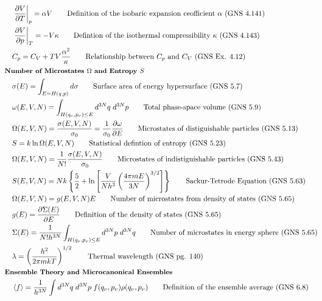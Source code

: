 \documentclass[10pt]{article}
\newcommand{\pder}[2]{\frac{\partial #1}{\partial #2}}
\newcommand{\lrp}[1]{\left( #1 \right)}
\newcommand{\lrb}[1]{\left[ #1 \right]}
\newcommand{\lrc}[1]{\left\{ #1 \right\}}
\newcommand{\evalb}[1]{\left. #1 \right|}
\begin{document}
\begin{multicols}{2}
	\setlength{\abovedisplayskip}{0pt}
	\setlength{\belowdisplayskip}{0pt}
	\setlength{\abovedisplayshortskip}{0pt}
	\setlength{\belowdisplayshortskip}{0pt}
	\begin{align*}
		& \evalb{\pder{V}{T}}_p = \alpha V	\tag*{Definition of the isobaric expansion ceofficient $\alpha$ (GNS 4.141)} \\
		& \evalb{\pder{V}{p}}_T = -V \kappa \tag*{Defintion of the isothermal compressibility $\kappa$ (GNS 4.143)} \\		
		& C_p = C_V +TV\frac{\alpha^2}{\kappa}	\tag*{Relationship between $C_p$ and $C_V$ (GNS Ex. 4.12)} \\
	& \small \hspace{-10pt} \textbf{Number of Microstates $\Omega$ and Entropy $S$} \small \\	
		& \sigma(E) = \int_{E=H(q,p)} d\sigma	\tag*{Surface area of energy hypersurface (GNS 5.7)} \\
		& \omega(E,V,N) = \int_{H(q_\nu, p_\nu) \leq E} d^{3N}q \; d^{3N} p	\tag*{Total phase-space volume (GNS 5.9)} \\
		& \Omega(E,V,N) = \frac{\sigma(E,V,N)}{\sigma_0} = \frac{1}{\sigma_0} \pder{\omega}{E}	\tag*{Microstates of distiguishable particles (GNS 5.13)} \\
		& S = k \ln \Omega(E,V,N)	\tag*{Statistical defintion of entropy (GNS 5.23)} \\
		& \Omega(E,V,N) = \frac{1}{N!} \frac{\sigma(E,V,N)}{\sigma_0}	\tag*{Microstates of indistiguishable particles (GNS 5.43)} \\
		& S(E,V,N) = Nk \lrc{\frac{5}{2} + \ln \lrb{\frac{V}{N h^3} \lrp{\frac{4 \pi m E}{3N}}^{3/2}}}	\tag*{Sackur-Tetrode Equation (GNS 5.63)} \\
		& \Omega(E,V,N) = g(E,V,N) E	\tag*{Number of microstates from density of states (GNS 5.65)} \\
		& g(E) = \pder{\Sigma(E)}{E}	\tag*{Definition of the density of states (GNS 5.65)} \\
		& \Sigma(E) = \frac{1}{N! h^{3N}} \int_{H(q_\nu,p_\nu) \leq E} d^{3N}p \; d^{3N}q	\tag*{Number of microstates in energy sphere (GNS 5.65)} \\
		& \lambda = \lrp{\frac{h^2}{2 \pi mkT}}^{1/2}	\tag*{Thermal wavelength (GNS pg. 140)} \\
	& \small \hspace{-10pt} \textbf{Ensemble Theory and Microcanonical Ensembles} \small \\
		& \expval{f} =  \frac{1}{h^{3N}}\int d^{3N} q \; d^{3N} p \; f(q_\nu,p_\nu) \rho (q_\nu, p_{\nu})	\tag*{Definition of the ensemble average (GNS 6.8)} \\

\end{align*}
\end{multicols}
\end{document}
